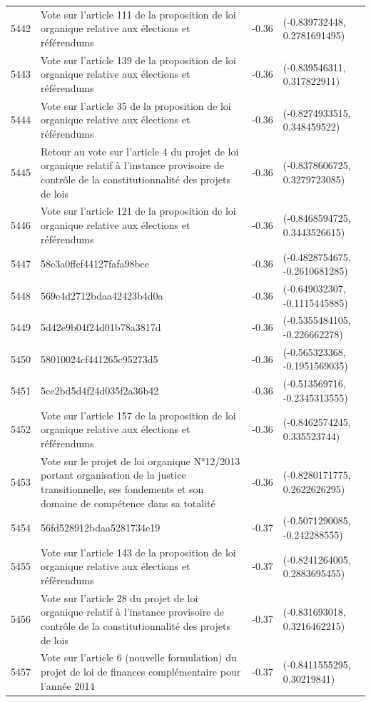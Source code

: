 \begin{table}[ht]
\begin{tabular}{rlrl}
  5442 & Vote sur l'article 111 de la proposition de loi organique relative aux élections et référendums & -0.36 & (-0.839732448, 0.2781691495) \\ 
  5443 & Vote sur l'article 139 de la proposition de loi organique relative aux élections et référendums & -0.36 & (-0.839546311, 0.317822911) \\ 
  5444 & Vote sur l'article 35 de la proposition de loi organique relative aux élections et référendums & -0.36 & (-0.8274933515, 0.348459522) \\ 
  5445 & Retour au vote sur l'article 4 du projet de loi organique relatif à l'instance provisoire de contrôle de la constitutionnalité des projets de lois & -0.36 & (-0.8378606725, 0.3279723085) \\ 
  5446 & Vote sur l'article 121 de la proposition de loi organique relative aux élections et référendums & -0.36 & (-0.8468594725, 0.3443526615) \\ 
  5447 & 58e3a0ffcf44127fafa98bce & -0.36 & (-0.4828754675, -0.2610681285) \\ 
  5448 & 569e4d2712bdaa42423b4d0a & -0.36 & (-0.649032307, -0.1115445885) \\ 
  5449 & 5d42e9b04f24d01b78a3817d & -0.36 & (-0.5355484105, -0.226662278) \\ 
  5450 & 58010024cf441265c95273d5 & -0.36 & (-0.565323368, -0.1951569035) \\ 
  5451 & 5ce2bd5d4f24d035f2a36b42 & -0.36 & (-0.513569716, -0.2345313555) \\ 
  5452 & Vote sur l'article 157 de la proposition de loi organique relative aux élections et référendums & -0.36 & (-0.8462574245, 0.335523744) \\ 
  5453 & Vote sur le projet de loi organique N°12/2013 portant organisation de la justice transitionnelle, ses fondements et son domaine de compétence dans sa totalité & -0.36 & (-0.8280171775, 0.2622626295) \\ 
  5454 & 56fd528912bdaa5281734e19 & -0.37 & (-0.5071290085, -0.242288555) \\ 
  5455 & Vote sur l'article 143 de la proposition de loi organique relative aux élections et référendums & -0.37 & (-0.8241264005, 0.2883695455) \\ 
  5456 & Vote sur l'article 28 du projet de loi organique relatif à l'instance provisoire de contrôle de la constitutionnalité des projets de lois & -0.37 & (-0.831693018, 0.3216462215) \\ 
  5457 & Vote sur l'article 6 (nouvelle formulation) du projet de loi de finances complémentaire pour l'année 2014 & -0.37 & (-0.8411555295, 0.30219841) \\ 

\end{tabular}
\end{table}
